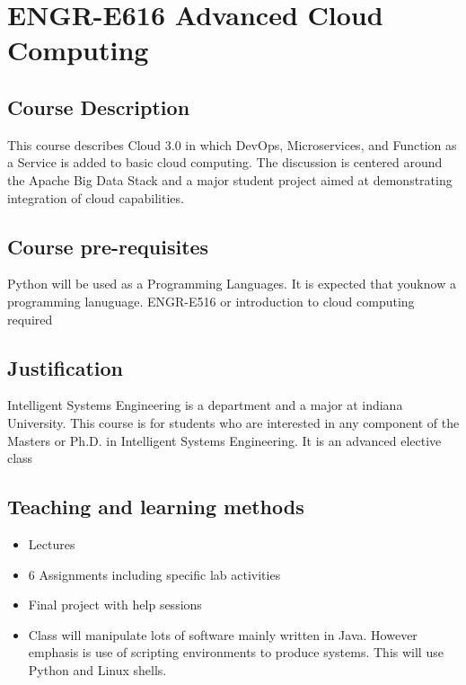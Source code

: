\FILENAME

\section{ENGR-E616 Advanced Cloud Computing}


\subsection{Course Description }

This course describes Cloud 3.0 in which DevOps, Microservices, and
Function as a Service is added to basic cloud computing. The
discussion is centered around the Apache Big Data Stack and a major
student project aimed at demonstrating integration of cloud
capabilities.

\subsection{Course pre-requisites}

Python will be used as a Programming Languages. It is expected that
youknow a programming lanuguage. ENGR-E516 or introduction to cloud
computing required

\subsection{Justification}

Intelligent Systems Engineering is a department and a major at indiana
University. This course is for students who are interested in any
component of the Masters or Ph.D. in Intelligent Systems Engineering.
It is an advanced elective class


\subsection{Teaching and learning methods}

\begin{itemize}
\item	Lectures
\item	6 Assignments including specific lab activities
\item	Final project with help sessions
\item	Class will manipulate lots of software mainly written in Java. However emphasis is use of scripting environments to produce systems. This will use Python and Linux shells.
\end{itemize}

